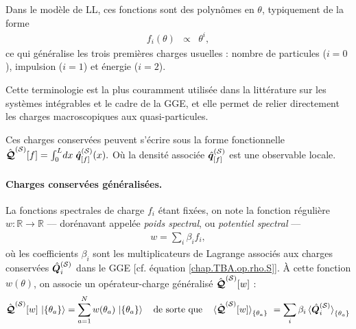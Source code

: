 \smallskip

Dans le modèle de \gls{LL}, ces fonctions sont des polynômes en \(\theta\), typiquement de la forme
\begin{eqnarray}\label{chap.2.charge.ordre.i.1.111111}
	f_i(\theta) & \propto & \theta^i,
\end{eqnarray}
ce qui généralise les trois premières charges usuelles : nombre de particules (\(i=0\)), impulsion (\(i=1\)) et énergie (\(i=2\)).

\smallskip

Cette terminologie est la plus couramment utilisée dans la littérature sur les systèmes intégrables et le cadre de la \gls{GGE}, et elle permet de relier directement les charges macroscopiques aux quasi-particules.


\medskip

Ces charges conservées peuvent s’écrire sous la forme fonctionnelle
\(
  \hat{\bm{\mathcal{Q}}}^{(\mathcal{S})}[f]=\int_0^{L}\!dx\;\hat{\bm{q}}^{(\mathcal{S})}_{[f]}(x).
\)
Où la densité associée
\(
\hat{\bm{q}}^{(\mathcal{S})}_{[f]}
\)
est une observable locale.



\paragraph{Charges conservées généralisées.\label{sec:charges-gen}}
La fonctions spectrales de charge $f_i$ étant fixées, on note la fonction régulière
\(
  w:\mathbb R\!\to\!\mathbb R
\)
–– dorénavant appelée \emph{poids spectral}, ou \emph{potentiel spectral} ––
\begin{eqnarray}
	w = \sum_i \beta_i f_i \label{chap.2.w.1},	
\end{eqnarray}
où les coefficients $\beta_i$ sont les multiplicateurs de Lagrange associés aux charges conservées $\hat{\bm{Q}}_i^{(\mathcal{S})}$ dans le \gls{GGE} [cf. équation \eqref{chap.TBA.op.rho.S}].
À cette fonction $w(\theta)$, on associe un opérateur-charge généralisé $\hat{\bm{\mathcal{Q}}}^{(\mathcal{S})}[w]$ :
\begin{eqnarray}\label{chap.2.charge.gen.1}
	\operator{\mathcal{Q}}^{(\mathcal{S})}[w]\,\ket{\{\theta_a\} } =  \sum_{a=1}^{N}w(\theta_a)\,\ket{\{\theta_a\} } \quad \mbox{de sorte que} \quad \braket{\operator{\mathcal{Q}}^{(\mathcal{S})}[w]}_{\{\theta_a\}} = \sum_{i} \beta_i  \braket{\operator{Q}^{(\mathcal{S})}_i}_{\{\theta_a\}}
\end{eqnarray}

